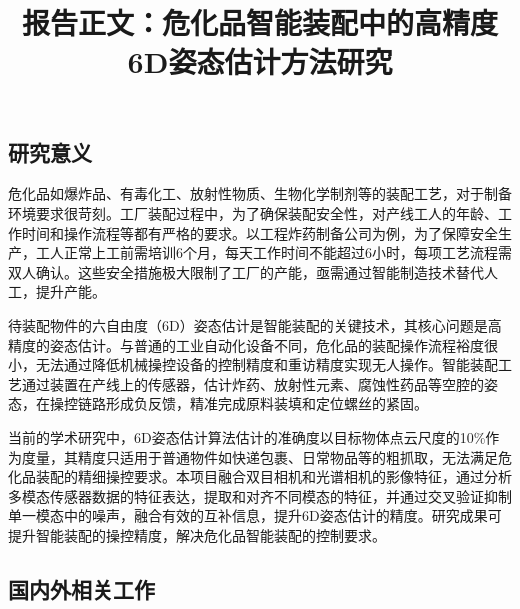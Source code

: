 \documentclass[12pt]{article}
\begin{document}

\title{报告正文：危化品智能装配中的高精度6D姿态估计方法研究}

\maketitle




\subsection{研究意义}

危化品如爆炸品、有毒化工、放射性物质、生物化学制剂等的装配工艺，对于制备环境要求很苛刻。工厂装配过程中，为了确保装配安全性，对产线工人的年龄、工作时间和操作流程等都有严格的要求。以工程炸药制备公司为例，为了保障安全生产，工人正常上工前需培训6个月，每天工作时间不能超过6小时，每项工艺流程需双人确认。这些安全措施极大限制了工厂的产能，亟需通过智能制造技术替代人工，提升产能。

待装配物件的六自由度（6D）姿态估计是智能装配的关键技术，其核心问题是高精度的姿态估计。与普通的工业自动化设备不同，危化品的装配操作流程裕度很小，无法通过降低机械操控设备的控制精度和重访精度实现无人操作。智能装配工艺通过装置在产线上的传感器，估计炸药、放射性元素、腐蚀性药品等空腔的姿态，在操控链路形成负反馈，精准完成原料装填和定位螺丝的紧固。

当前的学术研究中，6D姿态估计算法估计的准确度以目标物体点云尺度的10\%作为度量，其精度只适用于普通物件如快递包裹、日常物品等的粗抓取，无法满足危化品装配的精细操控要求。本项目融合双目相机和光谱相机的影像特征，通过分析多模态传感器数据的特征表达，提取和对齐不同模态的特征，并通过交叉验证抑制单一模态中的噪声，融合有效的互补信息，提升6D姿态估计的精度。研究成果可提升智能装配的操控精度，解决危化品智能装配的控制要求。

\subsection{国内外相关工作}
\end{document}
